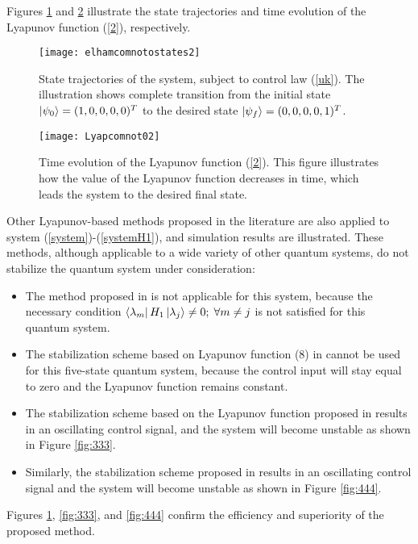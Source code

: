 \documentclass[journal]{IEEEtran}
\theoremstyle{definition}
\begin{document}
Figures \ref{fig:el1} and \ref{fig:el2} illustrate the state trajectories and time evolution of the Lyapunov function (\ref{2}), respectively. 
  \begin{figure}
      \centering
      \texttt{[image: elhamcomnotostates2]}
      \caption{State trajectories of the system, subject to control law (\ref{uk}). The illustration shows complete transition from the initial state $\ket{\psi_0}=(1,0,0,0,0)^T$ to the desired state $\ket{\psi_f}=(0,0,0,0,1)^T$.}
      \label{fig:el1}
  \end{figure}
  \begin{figure}
      \centering
      \texttt{[image: Lyapcomnot02]}
      \caption{Time evolution of the Lyapunov function (\ref{2}). This figure illustrates how the value of the Lyapunov function decreases in time, which leads the system to the desired final state.}
      \label{fig:el2}
  \end{figure}

Other Lyapunov-based methods proposed in the literature \cite{grivopoulos2003lyapunov,kuang2008lyapunov,mirrahimi2005lyapunov}  are also applied to system (\ref{system})-(\ref{systemH1}), and simulation results are illustrated. These methods, although applicable to a wide variety of other quantum systems, do not stabilize the quantum system under consideration:
\begin{itemize}
\item The method proposed in \cite{grivopoulos2003lyapunov} is not applicable for this system, because the necessary condition $\bra{\lambda_m}H_1\ket{\lambda_j}\neq 0; \; \forall m\neq j$ is not satisfied for this quantum system. 
\item The stabilization scheme based on Lyapunov function ($8$) in \cite{kuang2008lyapunov} cannot be used for this five-state quantum system, because the control input will stay equal to zero and the Lyapunov function remains constant.
\item The stabilization scheme based on the Lyapunov function proposed in \cite{kuang2008lyapunov} results in an oscillating control signal, and the system will become unstable as shown in Figure \ref{fig:333}. 
\item Similarly, the stabilization scheme proposed in \cite{mirrahimi2005lyapunov} results in an oscillating control signal and the system will become unstable as shown in Figure \ref{fig:444}. 
\end{itemize}
Figures \ref{fig:el1}, \ref{fig:333}, and \ref{fig:444} confirm the efficiency and superiority of the proposed method.
 
\end{document}
